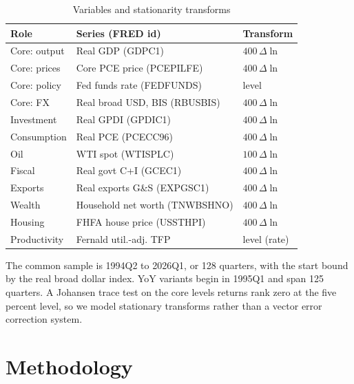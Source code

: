 \documentclass[conference]{IEEEtran}
\begin{document}
\begin{table}[t]
\caption{Variables and stationarity transforms}
\label{tab:data}
\centering
\small
\begin{tabular}{@{}lll@{}}
\toprule
Role & Series (FRED id) & Transform \\
\midrule
Core: output & Real GDP (GDPC1) & $400\,\Delta\ln$ \\
Core: prices & Core PCE price (PCEPILFE) & $400\,\Delta\ln$ \\
Core: policy & Fed funds rate (FEDFUNDS) & level \\
Core: FX & Real broad USD, BIS (RBUSBIS) & $400\,\Delta\ln$ \\
Investment & Real GPDI (GPDIC1) & $400\,\Delta\ln$ \\
Consumption & Real PCE (PCECC96) & $400\,\Delta\ln$ \\
Oil & WTI spot (WTISPLC) & $100\,\Delta\ln$ \\
Fiscal & Real govt C+I (GCEC1) & $400\,\Delta\ln$ \\
Exports & Real exports G\&S (EXPGSC1) & $400\,\Delta\ln$ \\
Wealth & Household net worth (TNWBSHNO) & $400\,\Delta\ln$ \\
Housing & FHFA house price (USSTHPI) & $400\,\Delta\ln$ \\
Productivity & Fernald util.-adj. TFP & level (rate) \\
\bottomrule
\end{tabular}
\end{table}

The common sample is 1994Q2 to 2026Q1, or 128 quarters, with the start bound by the real broad dollar index. YoY variants begin in 1995Q1 and span 125 quarters. A Johansen trace test on the core levels returns rank zero at the five percent level, so we model stationary transforms rather than a vector error correction system.

\section{Methodology}
\end{document}
